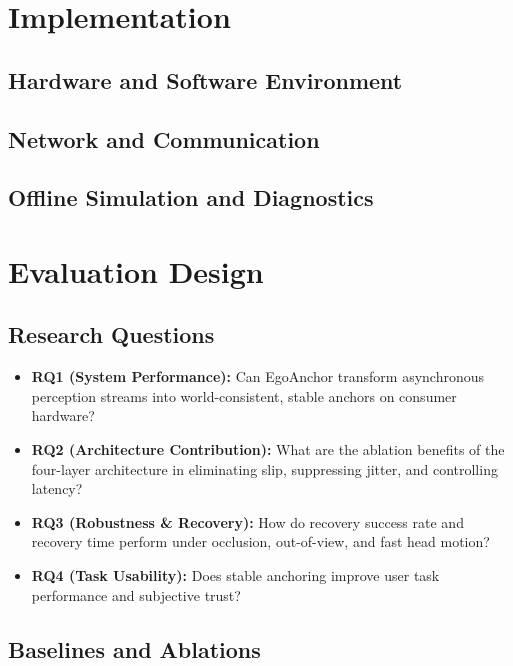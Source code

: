 \documentclass[review]{vgtc}
\begin{document}
\section{Implementation}

\subsection{Hardware and Software Environment}

\subsection{Network and Communication}

\subsection{Offline Simulation and Diagnostics}

\section{Evaluation Design}

\subsection{Research Questions}
\begin{itemize}[leftmargin=1.4em]
  \item \textbf{RQ1 (System Performance):} Can EgoAnchor transform asynchronous perception streams into world-consistent, stable anchors on consumer hardware?
  \item \textbf{RQ2 (Architecture Contribution):} What are the ablation benefits of the four-layer architecture in eliminating slip, suppressing jitter, and controlling latency?
  \item \textbf{RQ3 (Robustness \& Recovery):} How do recovery success rate and recovery time perform under occlusion, out-of-view, and fast head motion?
  \item \textbf{RQ4 (Task Usability):} Does stable anchoring improve user task performance and subjective trust?
\end{itemize}

\subsection{Baselines and Ablations}
\end{document}
